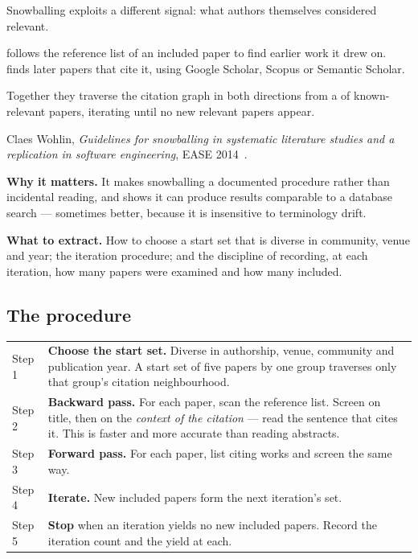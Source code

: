 Snowballing exploits a different signal: what authors themselves considered
relevant.

\begin{definitionbox}
 follows the reference list of an included paper to
find earlier work it drew on.  finds later papers
that cite it, using Google Scholar, Scopus or Semantic Scholar.

\medskip
Together they traverse the citation graph in both directions from a
 of known-relevant papers, iterating until no new relevant
papers appear.
\end{definitionbox}

\begin{paperbox}
Claes Wohlin, \emph{Guidelines for snowballing in systematic literature studies
and a replication in software engineering}, EASE
2014~\cite{wohlin2014guidelines}.

\medskip
\textbf{Why it matters.} It makes snowballing a documented procedure rather
than incidental reading, and shows it can produce results comparable to a
database search --- sometimes better, because it is insensitive to terminology
drift.

\medskip
\textbf{What to extract.} How to choose a start set that is diverse in
community, venue and year; the iteration procedure; and the discipline of
recording, at each iteration, how many papers were examined and how many
included.
\end{paperbox}

\subsection{The procedure}

\begin{center}
\small
\begin{tabular}{@{}L{1.4cm}L{13.0cm}@{}}
\toprule
Step 1 & \textbf{Choose the start set.} Diverse in authorship, venue,
         community and publication year. A start set of five papers by one
         group traverses only that group's citation neighbourhood. \\
Step 2 & \textbf{Backward pass.} For each paper, scan the reference list.
         Screen on title, then on the \emph{context of the citation} --- read
         the sentence that cites it. This is faster and more accurate than
         reading abstracts. \\
Step 3 & \textbf{Forward pass.} For each paper, list citing works and screen
         the same way. \\
Step 4 & \textbf{Iterate.} New included papers form the next iteration's set. \\
Step 5 & \textbf{Stop} when an iteration yields no new included papers. Record
         the iteration count and the yield at each. \\
\bottomrule
\end{tabular}
\end{center}

